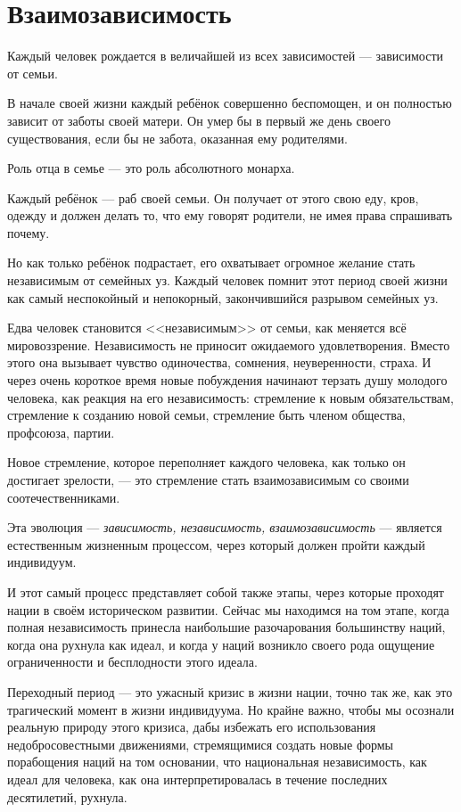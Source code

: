 \chapter{Взаимозависимость}

Каждый человек рождается в величайшей из всех зависимостей — зависимости от семьи.
 
В начале своей жизни каждый ребёнок совершенно беспомощен, и он полностью зависит от заботы своей матери. Он умер бы в первый же день своего существования, если бы не забота, оказанная ему родителями.

Роль отца в семье — это роль абсолютного монарха.

Каждый ребёнок — раб своей семьи. Он получает от этого свою еду, кров, одежду и должен делать то, что ему говорят родители, не имея права спрашивать почему.

Но как только ребёнок подрастает, его охватывает огромное желание стать независимым от семейных уз. Каждый человек помнит этот период своей жизни как самый неспокойный и непокорный, закончившийся разрывом семейных уз.

Едва человек становится <<независимым>> от семьи, как меняется всё мировоззрение. Независимость не приносит ожидаемого удовлетворения. Вместо этого она вызывает чувство одиночества, сомнения, неуверенности, страха. И через очень короткое время новые побуждения начинают терзать душу молодого человека, как реакция на его независимость: стремление к новым обязательствам, стремление к созданию новой семьи, стремление быть членом общества, профсоюза, партии.

Новое стремление, которое переполняет каждого человека, как только он достигает зрелости, — это стремление стать взаимозависимым со своими соотечественниками.

Эта эволюция — \textit{зависимость, независимость, взаимозависимость} — является естественным жизненным процессом, через который должен пройти каждый индивидуум.

И этот самый процесс представляет собой также этапы, через которые проходят нации в своём историческом развитии. Сейчас мы находимся на том этапе, когда полная независимость принесла наибольшие разочарования большинству наций, когда она рухнула как идеал, и когда у наций возникло своего рода ощущение ограниченности и бесплодности этого идеала.

Переходный период — это ужасный кризис в жизни нации, точно так же, как это трагический момент в жизни индивидуума. Но крайне важно, чтобы мы осознали реальную природу этого кризиса, дабы избежать его использования недобросовестными движениями, стремящимися создать новые формы порабощения наций на том основании, что национальная независимость, как идеал для человека, как она интерпретировалась в течение последних десятилетий, рухнула.

